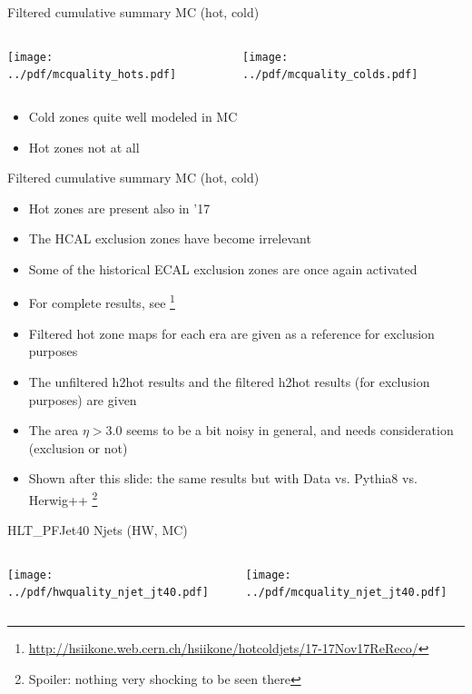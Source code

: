 \documentclass[9pt]{beamer}
\begin{document}
\begin{frame}[t]{Filtered cumulative summary MC (hot, cold)}
\begin{columns}[T]
  \begin{column}{.5\textwidth}
  \texttt{[image: ../pdf/mcquality\_hots.pdf]}
  \end{column}
  \begin{column}{.5\textwidth}
  \texttt{[image: ../pdf/mcquality\_colds.pdf]}
  \end{column}
\end{columns}
\begin{itemize}
 \item Cold zones quite well modeled in MC
 \item Hot zones not at all
\end{itemize}
\end{frame}

\begin{frame}[t]{Filtered cumulative summary MC (hot, cold)}
\begin{itemize}
 \item Hot zones are present also in '17
 \item The HCAL exclusion zones have become irrelevant
 \item Some of the historical ECAL exclusion zones are once again activated
 \item For complete results, see \footnote{\url{http://hsiikone.web.cern.ch/hsiikone/hotcoldjets/17-17Nov17ReReco/}}
 \item Filtered hot zone maps for each era are given as a reference for exclusion purposes
 \item The unfiltered h2hot results and the filtered h2hot results (for exclusion purposes) are given
 \item The area $\eta > 3.0$ seems to be a bit noisy in general, and needs consideration (exclusion or not)
 \item Shown after this slide: the same results but with Data vs. Pythia8 vs. Herwig++ \footnote{Spoiler: nothing very shocking to be seen there}
\end{itemize}
\end{frame}


\begin{frame}[t]{HLT\_PFJet40 Njets (HW, MC)}
\begin{columns}[T]
  \begin{column}{.5\textwidth}
  \texttt{[image: ../pdf/hwquality\_njet\_jt40.pdf]}
  \end{column}
  \begin{column}{.5\textwidth}
  \texttt{[image: ../pdf/mcquality\_njet\_jt40.pdf]}
  \end{column}
\end{columns}
\end{frame}
\end{document}
